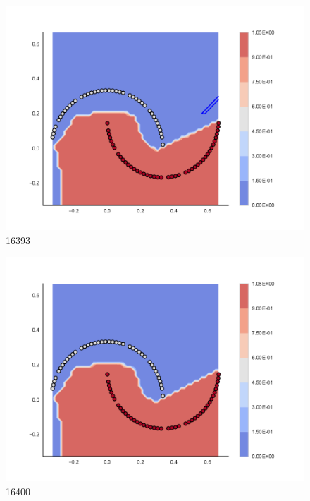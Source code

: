 \begin{subfigure}[b]{0.09\textwidth}
    \includegraphics[clip, trim=2.35cm 1.75cm 4.5cm 0cm,width=\textwidth]{img/convergence/16393.pdf}
    \caption{16393}
    \label{fig:convergence_16393}
\end{subfigure}
%
\begin{subfigure}[b]{0.09\textwidth}
    \includegraphics[clip, trim=2.35cm 1.75cm 4.5cm 0cm,width=\textwidth]{img/convergence/16400.pdf}
    \caption{16400}
    \label{fig:convergence_16400}
\end{subfigure}
%
